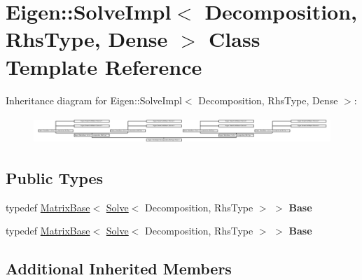 \hypertarget{class_eigen_1_1_solve_impl_3_01_decomposition_00_01_rhs_type_00_01_dense_01_4}{}\section{Eigen\+:\+:Solve\+Impl$<$ Decomposition, Rhs\+Type, Dense $>$ Class Template Reference}
\label{class_eigen_1_1_solve_impl_3_01_decomposition_00_01_rhs_type_00_01_dense_01_4}
Inheritance diagram for Eigen\+:\+:Solve\+Impl$<$ Decomposition, Rhs\+Type, Dense $>$\+:\begin{figure}[H]
\begin{center}
\leavevmode
\includegraphics[height=1.023392cm]{class_eigen_1_1_solve_impl_3_01_decomposition_00_01_rhs_type_00_01_dense_01_4}
\end{center}
\end{figure}
\subsection*{Public Types}
\begin{DoxyCompactItemize}
\item 
\mbox{\label{class_eigen_1_1_solve_impl_3_01_decomposition_00_01_rhs_type_00_01_dense_01_4_a8eb3f85f9e23106fe847ba4a0996c329}} 
typedef \hyperlink{group___core___module_class_eigen_1_1_matrix_base}{Matrix\+Base}$<$ \hyperlink{group___core___module_class_eigen_1_1_solve}{Solve}$<$ Decomposition, Rhs\+Type $>$ $>$ {\bfseries Base}
\item 
\mbox{\label{class_eigen_1_1_solve_impl_3_01_decomposition_00_01_rhs_type_00_01_dense_01_4_a8eb3f85f9e23106fe847ba4a0996c329}} 
typedef \hyperlink{group___core___module_class_eigen_1_1_matrix_base}{Matrix\+Base}$<$ \hyperlink{group___core___module_class_eigen_1_1_solve}{Solve}$<$ Decomposition, Rhs\+Type $>$ $>$ {\bfseries Base}
\end{DoxyCompactItemize}
\subsection*{Additional Inherited Members}


